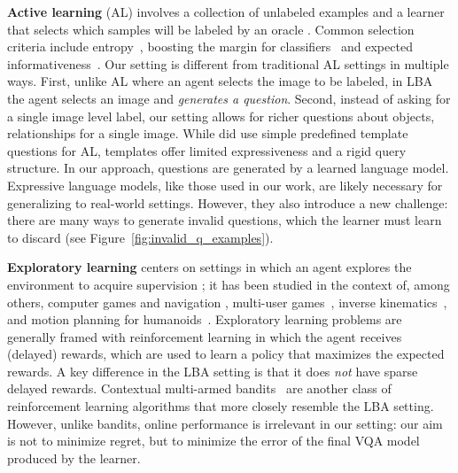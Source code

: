 \documentclass[10pt,twocolumn,letterpaper]{article}
\begin{document}
\textbf{Active learning} (AL) involves a collection of unlabeled examples and a learner that selects which samples will be labeled by an oracle \citep{vijayanarasimhan2014large,kapoor2007active,settles2010active,li2013adaptive}. Common selection criteria include entropy~\cite{joshi2009multi}, boosting the margin for classifiers~\cite{abramson2004active,collins2008towards} and expected informativeness~\cite{houlsby2011bayesian}. Our setting is different from traditional AL settings in multiple ways. First, unlike AL where an agent selects the image to be labeled, in LBA the agent selects an image and \emph{generates a question}. Second, instead of asking for a single image level label, our setting allows for richer questions about objects, relationships \etc for a single image. While \cite{siddiquie2010beyond} did use simple predefined template questions for AL, templates offer limited expressiveness and a rigid query structure. In our approach, questions are generated by a learned language model. Expressive language models, like those used in our work, are likely necessary for generalizing to real-world settings. However, they also introduce a new challenge: there are many ways to generate invalid questions, which the learner must learn to discard (see Figure~\ref{fig:invalid_q_examples}). 


\textbf{Exploratory learning} centers on settings in which an agent explores the environment to acquire supervision \citep{storck1995reinforcement}; it has been studied in the context of, among others, computer games and navigation \citep{kulkarni2016hierarchical,pathak2017curiosity}, multi-user games~\citep{merrick2009motivated}, inverse kinematics~\cite{baranes2013active}, and motion planning for humanoids~\citep{frank2014curiosity}. Exploratory learning problems are generally framed with reinforcement learning in which the agent receives (delayed) rewards, which are used to learn a policy that maximizes the expected rewards. A key difference in the LBA setting is that it does \emph{not} have sparse delayed rewards. 
Contextual multi-armed bandits~\citep{bubeck2012regret,langford2008epoch,li2010contextual} are another class of reinforcement learning algorithms that more closely resemble the LBA setting. However, unlike bandits, online performance is irrelevant in our setting: our aim is not to minimize regret, but to minimize the error of the final VQA model produced by the learner.
\end{document}
